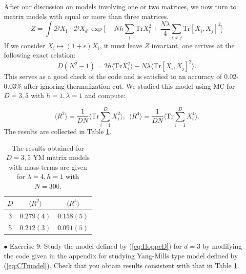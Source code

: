 \documentclass[11pt]{article}
\begin{document}
After our discussion on models involving one or two matrices, we now turn to matrix models 
with equal or more than three matrices. %
\begin{equation}
\label{eq:HoppeD} 
	Z = \int \mathcal{D}X_1 \cdots \mathcal{D}X_d ~
	\exp\Big[ -Nh\sum_{i}\mbox{Tr}X_{i}^{2} + \frac{N\lambda}{4} \sum_{i \neq j} \mbox{Tr} [X_i,X_j]^{2}\Big]
\end{equation}
If we consider $X_i \mapsto (1+\epsilon) X_i$, it must leave $Z$ invariant, one arrives at the following exact relation: 
\begin{equation}
	D(N^2 -1) = 2 h \langle \mbox{Tr}X_{i}^{2} \rangle 
	- N \lambda \langle \mbox{Tr}[X_i,X_j]^{2} \rangle. 
\end{equation}
This serves as a good check of the code and is satisfied to an accuracy of 0.02-0.03\% after ignoring thermalization cut. We studied this model using MC for $D=3,5$ with $h=1, \lambda=1$ and compute: 

\begin{equation}
\label{eq:R2R4} 
	\langle R^2 \rangle =   \frac{1}{DN} \Bigg \langle \mbox{Tr} \sum_{i=1}^{D} X_{i}^2 \bigg \rangle, 
	~~ \langle R^4 \rangle =   \frac{1}{DN} \Bigg \langle \mbox{Tr} \sum_{i=1}^{D} X_{i}^4 \bigg \rangle.  
\end{equation}
The results are collected in Table \ref{table:D_YMM_data}. 

\begin{table}[h!]
	\centering
	\begin{tabular}{||c c c||} 
		\hline
		$D$ & $ \langle R^2 \rangle$ & $ \langle R^4 \rangle$ \\ [0.5ex] 
		\hline\hline
		3 & $ 0.279(4) $ & $ 0.158(5) $  \\ 
		5 & $ 0.212(3) $ & $ 0.091(5) $
		 \\ [1ex] 
		\hline 
	\end{tabular}
\caption{The results obtained for $D = 3,5$ YM matrix models with mass terms are given for $\lambda=4, h=1$ with $N=300$.}
\label{table:D_YMM_data}
\end{table}


\begin{mdframed}[backgroundcolor=blue!3] 
	\textsc{} 
	$\bullet$ Exercise 9: Study the model defined by (\ref{eq:HoppeD}) for $d=3$ by modifying the code given in the appendix for studying Yang-Mills type model defined by (\ref{eq:CTmodel}). Check that you obtain results consistent
	with that in Table \ref{table:D_YMM_data}.  
\end{mdframed}
\end{document}
